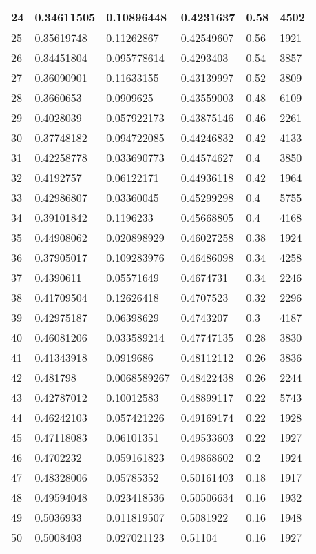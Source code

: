 \begin{longtable}{|l|l|l|l|l|l|}
24 & 0.34611505 & 0.10896448 & 0.4231637 & 0.58 & 4502 \\ \hline 
25 & 0.35619748 & 0.11262867 & 0.42549607 & 0.56 & 1921 \\ \hline 
26 & 0.34451804 & 0.095778614 & 0.4293403 & 0.54 & 3857 \\ \hline 
27 & 0.36090901 & 0.11633155 & 0.43139997 & 0.52 & 3809 \\ \hline 
28 & 0.3660653 & 0.0909625 & 0.43559003 & 0.48 & 6109 \\ \hline 
29 & 0.4028039 & 0.057922173 & 0.43875146 & 0.46 & 2261 \\ \hline 
30 & 0.37748182 & 0.094722085 & 0.44246832 & 0.42 & 4133 \\ \hline 
31 & 0.42258778 & 0.033690773 & 0.44574627 & 0.4 & 3850 \\ \hline 
32 & 0.4192757 & 0.06122171 & 0.44936118 & 0.42 & 1964 \\ \hline 
33 & 0.42986807 & 0.03360045 & 0.45299298 & 0.4 & 5755 \\ \hline 
34 & 0.39101842 & 0.1196233 & 0.45668805 & 0.4 & 4168 \\ \hline 
35 & 0.44908062 & 0.020898929 & 0.46027258 & 0.38 & 1924 \\ \hline 
36 & 0.37905017 & 0.109283976 & 0.46486098 & 0.34 & 4258 \\ \hline 
37 & 0.4390611 & 0.05571649 & 0.4674731 & 0.34 & 2246 \\ \hline 
38 & 0.41709504 & 0.12626418 & 0.4707523 & 0.32 & 2296 \\ \hline 
39 & 0.42975187 & 0.06398629 & 0.4743207 & 0.3 & 4187 \\ \hline 
40 & 0.46081206 & 0.033589214 & 0.47747135 & 0.28 & 3830 \\ \hline 
41 & 0.41343918 & 0.0919686 & 0.48112112 & 0.26 & 3836 \\ \hline 
42 & 0.481798 & 0.0068589267 & 0.48422438 & 0.26 & 2244 \\ \hline 
43 & 0.42787012 & 0.10012583 & 0.48899117 & 0.22 & 5743 \\ \hline 
44 & 0.46242103 & 0.057421226 & 0.49169174 & 0.22 & 1928 \\ \hline 
45 & 0.47118083 & 0.06101351 & 0.49533603 & 0.22 & 1927 \\ \hline 
46 & 0.4702232 & 0.059161823 & 0.49868602 & 0.2 & 1924 \\ \hline 
47 & 0.48328006 & 0.05785352 & 0.50161403 & 0.18 & 1917 \\ \hline 
48 & 0.49594048 & 0.023418536 & 0.50506634 & 0.16 & 1932 \\ \hline 
49 & 0.5036933 & 0.011819507 & 0.5081922 & 0.16 & 1948 \\ \hline 
50 & 0.5008403 & 0.027021123 & 0.51104 & 0.16 & 1927 \\ \hline 
\end{longtable}